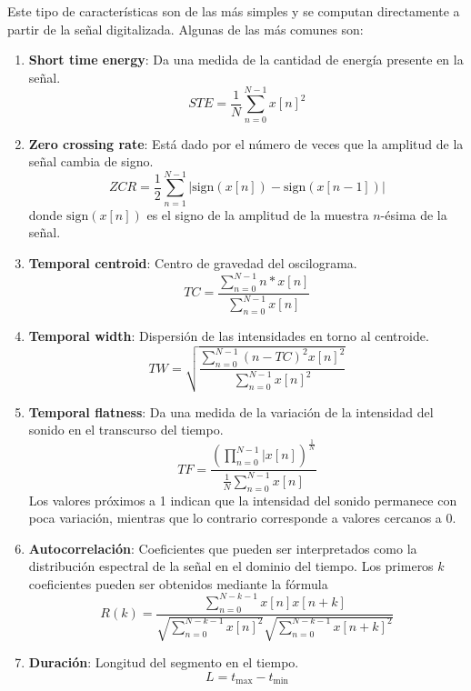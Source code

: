 Este tipo de características son de las más simples y se computan directamente a partir de la señal digitalizada.
Algunas de las más comunes son:

\begin{enumerate}
    \item \textbf{Short time energy}: Da una medida de la cantidad de energía presente en la señal.
    \[
        STE = \frac{1}{N}\sum_{n=0}^{N-1}{x[n]^2}
    \]
    \item \textbf{Zero crossing rate}: Está dado por el número de veces que la amplitud de la señal cambia de signo.
    \[
        ZCR = \frac{1}{2}\sum_{n=1}^{N-1}{|\text{sign}(x[n]) - \text{sign}(x[n-1])|}
    \]
    donde $\text{sign}(x[n])$ es el signo de la amplitud de la muestra $n$-ésima de la señal.
    \item \textbf{Temporal centroid}: Centro de gravedad del oscilograma.
    \[
        TC = \frac{\sum_{n=0}^{N-1}{n*x[n]}}{\sum_{n=0}^{N-1}{x[n]}}
    \]
    \item \textbf{Temporal width}: Dispersión de las intensidades en torno al centroide.
    \[
        TW = \sqrt{\frac{\sum_{n=0}^{N-1}{(n-TC)^2 x[n]^2}}{\sum_{n=0}^{N-1}{x[n]^2}}}
    \]
    \item \textbf{Temporal flatness}: Da una medida de la variación de la intensidad del sonido en el transcurso del tiempo.
    \[
        TF = \frac{(\prod_{n=0}^{N-1}{|x[n]})^{\frac{1}{N}}}{\frac{1}{N}\sum_{n=0}^{N-1}{x[n]}}
    \]
    Los valores próximos a 1 indican que la intensidad del sonido permanece con poca variación, mientras que lo contrario corresponde a valores cercanos a 0.
    \item \textbf{Autocorrelación}: Coeficientes que pueden ser interpretados como la distribución espectral de la señal en el dominio del tiempo.
    Los primeros $k$ coeficientes pueden ser obtenidos mediante la fórmula
    \[
        R(k) = \frac{\sum_{n=0}^{N-k-1}{x[n]x[n+k]}}{\sqrt{\sum_{n=0}^{N-k-1}{x[n]^2}}\sqrt{\sum_{n=0}^{N-k-1}{x[n+k]^2}}}
    \]
    \item \textbf{Duración}: Longitud del segmento en el tiempo.
    \[
        L = t_{\max} - t_{\min}
    \]
\end{enumerate}
